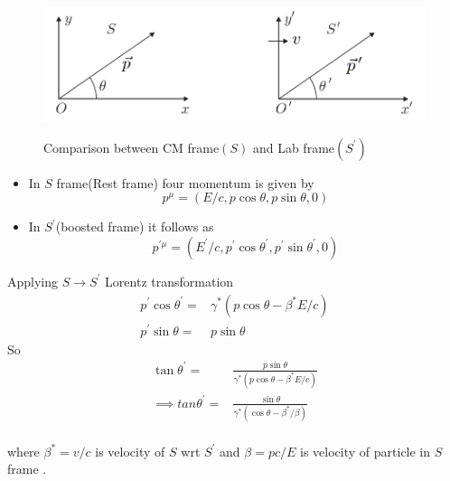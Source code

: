 \begin{figure}[h]
    \centering
    \includegraphics[width=12cm, height=4cm]{1.png}
    \caption{Comparison between CM frame$(S)$ and Lab frame$(S^\prime)$}
    \label{fig:my_label}
\end{figure}
\begin{itemize}
    \item 
In $S$ frame(Rest frame) four momentum is given by  
    \begin{equation}
        p^{\mu} = (E/c, p \cos{\theta}, p\sin{\theta}, 0)
    \end{equation}
\item
In $S^{\prime}$(boosted frame) it follows as 
    \begin{equation}
        p^{\prime\mu} = (E^\prime/c, p^\prime \cos{\theta^\prime}, p^\prime\sin{\theta^\prime}, 0)
    \end{equation}
\end{itemize}
\noindent

Applying $S \longrightarrow S^{\prime}$ Lorentz transformation
\begin{equation}
    \begin{split}
        p^{\prime}\cos{\theta^{\prime}} = & \gamma^{*}(p\cos{\theta}-\beta^{*}E/c)\\
        p^{\prime}\sin{\theta} =& p\sin{\theta}
    \end{split}
\end{equation} 
So 
\begin{equation}
    \begin{split}
        \tan {\theta^{\prime}} =& \frac{p\sin{\theta}}{\gamma^{*}(p\cos{\theta}-\beta^{*}E/c)} \\
        \implies tan\theta^{\prime} =& \frac{\sin{\theta}}{\gamma^{*}(\cos{\theta}-\beta^{*}/\beta)}\label{eq:3.17}
    \end{split}
\end{equation}
\\ 
where $\beta^{*} = v/c$ is velocity of $S$ wrt $S^{\prime}$ and $\beta= p c/E$ is velocity of particle in $S$ frame .\\

